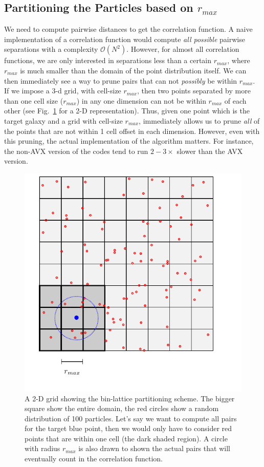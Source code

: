 \documentclass[12pt,titlepage]{article}
\newcommand{\rmax}{\ensuremath{{r_{max}}}\xspace}
\begin{document}
\subsection{Partitioning the Particles based on \texorpdfstring{\rmax}{rmax}}
We need to compute pairwise distances to get the correlation function. A naive implementation of a correlation function would compute {\em all possible} 
pairwise separations with a complexity $\mathcal{O}(N^2)$. However, for almost all correlation functions, we are only interested in separations less than 
a certain \rmax, where \rmax is much smaller than the domain of the point distribution itself. We can then immediately see a way to prune pairs that can not
{\em possibly} be within \rmax. If we impose a 3-d grid, with cell-size \rmax, then two points separated by more than one cell size (\rmax) in any one 
dimension can not be within \rmax of each other (see Fig.~\ref{fig:grid} for a 2-D representation). Thus, given one point which is the target galaxy and a grid with cell-size \rmax, 
immediately allows us to prune {\em all} of the points that are not within 1 cell offset in each dimension. However, even with this pruning, the actual 
implementation of the algorithm matters. For instance, the non-AVX version of the codes tend to run $2-3\times$ slower than the AVX version. 
\begin{figure}
\centering
\includegraphics[width=\textwidth,clip=true]{tikz_grid}
\caption{A 2-D grid showing the bin-lattice partitioning scheme. The bigger square show the entire
domain, the red circles show a random distribution of 100 particles. Let's say we want to compute all pairs
for the target blue point, then we would only have to consider red points that are within one cell (the dark shaded region).
A circle with radius \rmax is also drawn to shown the actual pairs that will eventually count in the correlation function.}
\label{fig:grid}
\end{figure}
\end{document}
